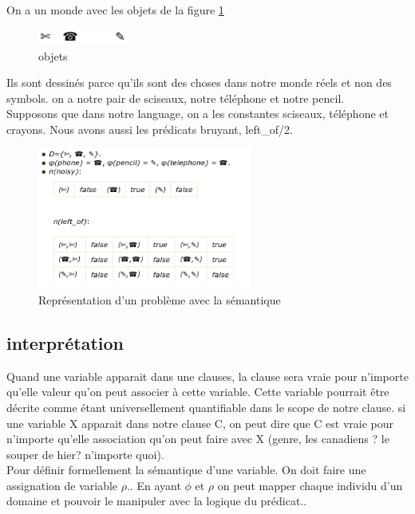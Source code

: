 \documentclass[oneside]{book}
\begin{document}
On a un monde avec les objets de la figure \ref{fig:semantics}
\begin{figure}[!ht]
\centering
\includegraphics[width = 3cm, keepaspectratio]{semantics.png}
\caption{objets}
\label{fig:semantics}
\end{figure}

Ils sont dessinés parce qu'ils sont des choses dans notre monde réels et non des symbols. on a notre pair de sciseaux, notre téléphone et notre pencil.\\
Supposons que dans notre language, on a les constantes sciseaux, téléphone et crayons. Nous avons aussi les prédicats bruyant, left\_of/2. 

\begin{figure}[!ht]
\centering
\includegraphics[width = 7cm, keepaspectratio]{semantics2.png}
\caption{Représentation d'un problème avec la sémantique}
\label{fig:semantics2}
\end{figure}

\subsection{interprétation}
Quand une variable apparait dans une clauses, la clause sera vraie pour n'importe qu'elle valeur qu'on peut associer à cette variable. Cette variable pourrait être décrite comme étant universellement quantifiable dans le scope de notre clause. si une variable X apparait dans notre clause C, on peut dire que C est vraie pour n'importe qu'elle association qu'on peut faire avec X (genre, les canadiens ? le souper de hier? n'importe quoi).\\

Pour définir formellement la sémantique d'une variable. On doit faire une assignation de variable $\rho$.. En ayant $\phi$ et $\rho$ on peut mapper chaque individu d'un domaine et pouvoir le manipuler avec la logique du prédicat..\\
\end{document}

